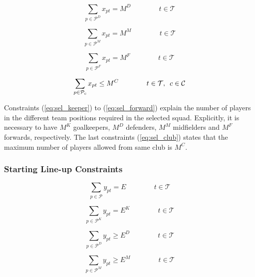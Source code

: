 \begin{equation} \label{eq_sel_defender}
    \sum_{p \in \mathcal{P}^{D}} x_{pt} = M^{D} \qquad\qquad t \in \mathcal{T}
\end{equation}

\begin{equation} \label{eq:sel_midfielder}
    \sum_{p \in \mathcal{P}^{M}} x_{pt} = M^{M} \qquad\qquad t \in \mathcal{T}
\end{equation}

\begin{equation} \label{eq:sel_forward}
    \sum_{p \in \mathcal{P}^{F}} x_{pt} = M^{F} \qquad\qquad t \in \mathcal{T}
\end{equation}

\begin{equation} \label{eq:sel_club}
    \sum_{p \in \mathcal{P}_{c}} x_{pt} \leq M^{C} \qquad\qquad t \in \mathcal{T}, \enskip   c \in \mathcal{C}
\end{equation}

Constraints (\ref{eq:sel_keeper}) to (\ref{eq:sel_forward}) explain the number of players in the different team positions required in the selected squad. Explicitly, it is necessary to have $M^{K}$ goalkeepers, $M^{D}$ defenders, $M^{M}$ midfielders and $M^{F}$ forwards, respectively. The last constraints (\ref{eq:sel_club}) states that the maximum number of players allowed from same club is $M^{C}$. 

\subsubsection{Starting Line-up Constraints}\label{team_start}

\begin{equation} \label{eq:start_team}
    \sum_{p \in \mathcal{P}}y_{pt}= E \qquad\qquad t \in \mathcal{T}
\end{equation}

\begin{equation}\label{eq:start_keeper}
    \sum_{p \in \mathcal{P}^{K}} y_{pt}= E^{K} \qquad\qquad t \in \mathcal{T}
\end{equation}

\begin{equation} \label{eq:start_defender}
    \sum_{p \in \mathcal{P}^{D}} y_{pt} \geq E^{D}  \qquad\qquad t \in \mathcal{T}
\end{equation}

\begin{equation}\label{eq:start_midfielder}
    \sum_{p \in \mathcal{P}^{M}} y_{pt}\geq E^{M} \qquad\qquad t \in \mathcal{T}
\end{equation}

